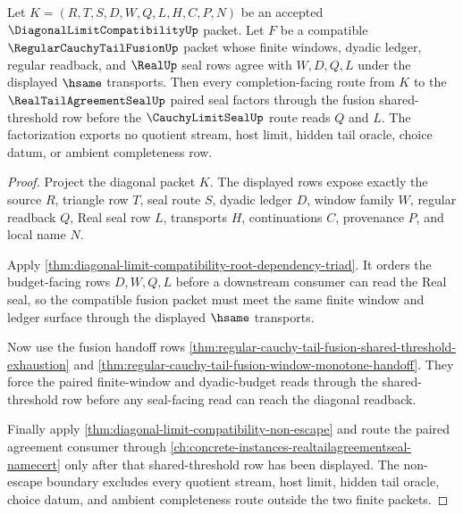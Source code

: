 \begin{theorem}
\label{thm:diagonal-limit-compatibility-shared-tail-budget-factorization}
Let $K=(R,T,S,D,W,Q,L,H,C,P,N)$ be an accepted
$\DiagonalLimitCompatibilityUp$ packet. Let $F$ be a compatible
$\RegularCauchyTailFusionUp$ packet whose finite windows, dyadic ledger, regular
readback, and $\RealUp$ seal rows agree with $W,D,Q,L$ under the displayed
$\hsame$ transports. Then every completion-facing route from $K$ to the
$\RealTailAgreementSealUp$ paired seal factors through the fusion
shared-threshold row before the $\CauchyLimitSealUp$ route reads $Q$ and $L$.
The factorization exports no quotient stream, host limit, hidden tail oracle,
choice datum, or ambient completeness row.
\end{theorem}
\begin{proof}
Project the diagonal packet $K$. The displayed rows expose exactly the source
$R$, triangle row $T$, seal route $S$, dyadic ledger $D$, window family $W$,
regular readback $Q$, Real seal row $L$, transports $H$, continuations $C$,
provenance $P$, and local name $N$.

Apply \autoref{thm:diagonal-limit-compatibility-root-dependency-triad}. It
orders the budget-facing rows $D,W,Q,L$ before a downstream consumer can read
the Real seal, so the compatible fusion packet must meet the same finite window
and ledger surface through the displayed $\hsame$ transports.

Now use the fusion handoff rows
\autoref{thm:regular-cauchy-tail-fusion-shared-threshold-exhaustion} and
\autoref{thm:regular-cauchy-tail-fusion-window-monotone-handoff}. They force
the paired finite-window and dyadic-budget reads through the shared-threshold
row before any seal-facing read can reach the diagonal readback.

Finally apply \autoref{thm:diagonal-limit-compatibility-non-escape} and route
the paired agreement consumer through
\autoref{ch:concrete-instances-realtailagreementseal-namecert} only after that
shared-threshold row has been displayed. The non-escape boundary excludes every
quotient stream, host limit, hidden tail oracle, choice datum, and ambient
completeness route outside the two finite packets.
\end{proof}

